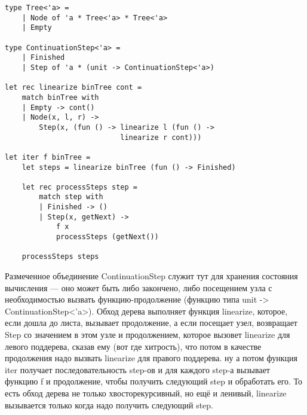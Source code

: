\documentclass[a5paper]{article}
\begin{document}
\begin{verbatim}
type Tree<'a> =
    | Node of 'a * Tree<'a> * Tree<'a>
    | Empty

type ContinuationStep<'a> =
    | Finished
    | Step of 'a * (unit -> ContinuationStep<'a>)

let rec linearize binTree cont =
    match binTree with
    | Empty -> cont()
    | Node(x, l, r) ->
        Step(x, (fun () -> linearize l (fun () -> 
                           linearize r cont)))

let iter f binTree =
    let steps = linearize binTree (fun () -> Finished)

    let rec processSteps step =
        match step with
        | Finished -> ()
        | Step(x, getNext) -> 
            f x
            processSteps (getNext())
    
    processSteps steps
\end{verbatim}

Размеченное объединение ContinuationStep служит тут для хранения состояния вычисления --- оно может быть либо закончено, либо посещением узла с необходимостью вызвать функцию-продолжение (функцию типа unit -> ContinuationStep<'a>). Обход дерева выполняет функция linearize, которое, если дошла до листа, вызывает продолжение, а если посещает узел, возвращает Step со значением в этом узле и продолжением, которое вызовет linearize для левого поддерева, сказав ему (вот где хитрость), что потом в качестве продолжения надо вызвать linearize для правого поддерева. ну а потом функция iter получает последовательность step-ов и для каждого step-а вызывает функцию f и продолжение, чтобы получить следующий step и обработать его. То есть обход дерева не только хвосторекурсивный, но ещё и ленивый, linearize вызывается только когда надо получить следующий step.
\end{document}
